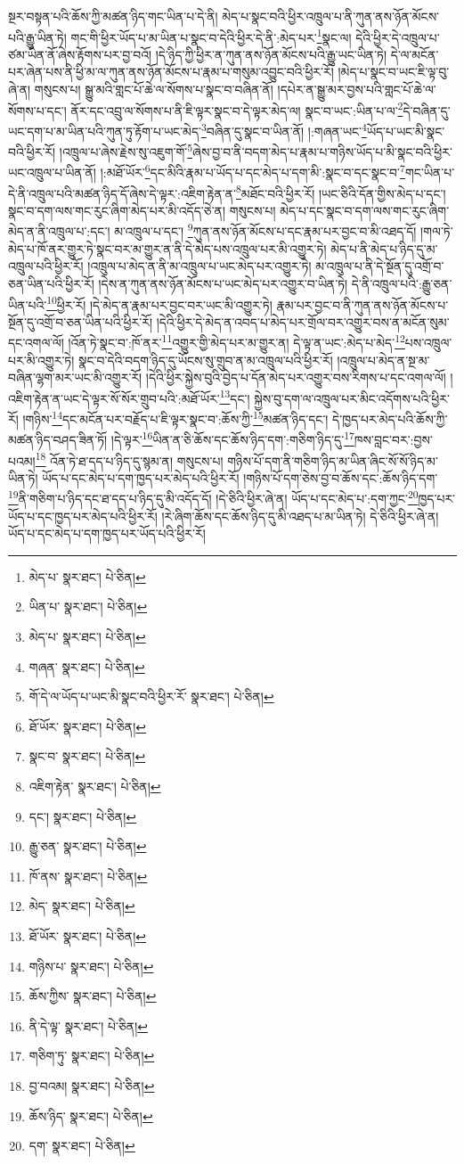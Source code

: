 སྔར་བསྟན་པའི་ཆོས་ཀྱི་མཚན་ཉིད་གང་ཡིན་པ་དེ་ནི། མེད་པ་སྣང་བའི་ཕྱིར་འཁྲུལ་པ་ནི་ཀུན་ནས་ཉོན་མོངས་པའི་རྒྱུ་ཡིན་ཏེ། གང་གི་ཕྱིར་ཡོད་པ་མ་ཡིན་པ་སྣང་བ་དེའི་ཕྱིར་དེ་ནི་:མེད་པར་\footnote{མེད་པ་  སྣར་ཐང་།  པེ་ཅིན། }སྣང་ལ། དེའི་ཕྱིར་དེ་འཁྲུལ་པ་ཙམ་ཡིན་ནོ་ཞེས་རྟོགས་པར་བྱ་བའོ། །དེ་ཉིད་ཀྱི་ཕྱིར་ན་ཀུན་ནས་ཉོན་མོངས་པའི་རྒྱུ་ཡང་ཡིན་ཏེ། དེ་ལ་མངོན་པར་ཞེན་པས་ནི་ཕྱི་མ་ལ་ཀུན་ནས་ཉོན་མོངས་པ་རྣམ་པ་གསུམ་འབྱུང་བའི་ཕྱིར་རོ། །མེད་པ་སྣང་བ་ཡང་ཇི་ལྟ་བུ་ཞེ་ན། གསུངས་པ། སྒྱུ་མའི་གླང་པོ་ཆེ་ལ་སོགས་པ་སྣང་བ་བཞིན་ནོ། །དཔེར་ན་སྒྱུ་མར་བྱས་པའི་གླང་པོ་ཆེ་ལ་སོགས་པ་དང་། ནོར་དང་འབྲུ་ལ་སོགས་པ་ནི་ཇི་ལྟར་སྣང་བ་དེ་ལྟར་མེད་ལ། སྣང་བ་ཡང་:ཡིན་པ་ལ་\footnote{ཡིན་པ་  སྣར་ཐང་།  པེ་ཅིན། }དེ་བཞིན་དུ་ཡང་དག་པ་མ་ཡིན་པའི་ཀུན་ཏུ་རྟོག་པ་ཡང་མེད་\footnote{མེད་པ་  སྣར་ཐང་།  པེ་ཅིན། }བཞིན་དུ་སྣང་བ་ཡིན་ནོ། །:གཞན་ཡང་\footnote{གཞན་  སྣར་ཐང་།  པེ་ཅིན། }ཡོད་པ་ཡང་མི་སྣང་བའི་ཕྱིར་རོ། །འཁྲུལ་པ་ཞེས་རྗེས་སུ་འཇུག་གོ་\footnote{གོ་དེ་ལ་ཡོད་པ་ཡང་མི་སྣང་བའི་ཕྱིར་རོ་  སྣར་ཐང་།  པེ་ཅིན། }ཞེས་བྱ་བ་ནི་བདག་མེད་པ་རྣམ་པ་གཉིས་ཡོད་པ་མི་སྣང་བའི་ཕྱིར་ཡང་འཁྲུལ་པ་ཡིན་ནོ། །:མཐོ་ཡོར་\footnote{ཐོ་ཡོར་  སྣར་ཐང་།  པེ་ཅིན། }དང་མིའི་རྣམ་པ་ཡོད་པ་དང་མེད་པ་དག་མི་:སྣང་བ་དང་སྣང་བ་\footnote{སྣང་བ་  སྣར་ཐང་།  པེ་ཅིན། }གང་ཡིན་པ་དེ་ནི་འཁྲུལ་པའི་མཚན་ཉིད་དོ་ཞེས་དེ་ལྟར་:འཇིག་རྟེན་ན་\footnote{འཇིག་རྟེན་  སྣར་ཐང་།  པེ་ཅིན། }མཐོང་བའི་ཕྱིར་རོ། །ཡང་ཅིའི་དོན་གྱིས་མེད་པ་དང་། སྣང་བ་དག་ལས་གང་རུང་ཞིག་མེད་པར་མི་འདོད་ཅེ་ན། གསུངས་པ། མེད་པ་དང་སྣང་བ་དག་ལས་གང་རུང་ཞིག་མེད་ན་ནི་འཁྲུལ་པ་:དང་། མ་འཁྲུལ་པ་དང་། \footnote{དང་།    སྣར་ཐང་།  པེ་ཅིན། }ཀུན་ནས་ཉོན་མོངས་པ་དང་རྣམ་པར་བྱང་བ་མི་འཐད་དོ། །གལ་ཏེ་མེད་པ་ཁོ་ནར་གྱུར་ཏེ་སྣང་བར་མ་གྱུར་ན་ནི་དེ་མེད་པས་འཁྲུལ་པར་མི་འགྱུར་ཏེ། མེད་པ་ནི་མེད་པ་ཉིད་དུ་མ་འཁྲུལ་པའི་ཕྱིར་རོ། །འཁྲུལ་པ་མེད་ན་ནི་མ་འཁྲུལ་པ་ཡང་མེད་པར་འགྱུར་ཏེ། མ་འཁྲུལ་པ་ནི་དེ་སྔོན་དུ་འགྲོ་བ་ཅན་ཡིན་པའི་ཕྱིར་རོ། །དེས་ན་ཀུན་ནས་ཉོན་མོངས་པ་ཡང་མེད་པར་འགྱུར་བ་ཡིན་ཏེ། དེ་ནི་འཁྲུལ་པའི་:རྒྱུ་ཅན་ཡིན་པའི་\footnote{རྒྱུ་ཅན་  སྣར་ཐང་།  པེ་ཅིན། }ཕྱིར་རོ། །དེ་མེད་ན་རྣམ་པར་བྱང་བར་ཡང་མི་འགྱུར་ཏེ། རྣམ་པར་བྱང་བ་ནི་ཀུན་ནས་ཉོན་མོངས་པ་སྔོན་དུ་འགྲོ་བ་ཅན་ཡིན་པའི་ཕྱིར་རོ། །དེའི་ཕྱིར་དེ་མེད་ན་འབད་པ་མེད་པར་གྲོལ་བར་འགྱུར་བས་ན་མངོན་སུམ་དང་འགལ་ལོ། །འོན་ཏེ་སྣང་བ་:ཁོ་ནར་\footnote{ཁོ་ནས་  སྣར་ཐང་།  པེ་ཅིན། }འགྱུར་གྱི་མེད་པར་མ་གྱུར་ན། དེ་ལྟ་ན་ཡང་:མེད་པ་མེད་\footnote{མེད་  སྣར་ཐང་།  པེ་ཅིན། }པས་འཁྲུལ་པར་མི་འགྱུར་ཏེ། སྣང་བ་དེའི་བདག་ཉིད་དུ་ཡོངས་སུ་གྲུབ་ན་མ་འཁྲུལ་པའི་ཕྱིར་རོ། །འཁྲུལ་པ་མེད་ན་སྔ་མ་བཞིན་ལྷག་མར་ཡང་མི་འགྱུར་རོ། །དེའི་ཕྱིར་སྐྱེས་བུའི་བྱེད་པ་དོན་མེད་པར་འགྱུར་བས་རིགས་པ་དང་འགལ་ལོ། །འཇིག་རྟེན་ན་ཡང་དེ་ལྟར་སོ་སོར་གྲུབ་པའི་:མཐོ་ཡོར་\footnote{ཐོ་ཡོར་  སྣར་ཐང་།  པེ་ཅིན། }དང་། སྐྱེས་བུ་དག་ལ་འཁྲུལ་པར་མིང་འདོགས་པའི་ཕྱིར་རོ། །གཉིས་\footnote{གཉིས་པ་  སྣར་ཐང་།  པེ་ཅིན། }དང་མངོན་པར་བརྗོད་པ་ཇི་ལྟར་སྣང་བ་:ཆོས་ཀྱི་\footnote{ཆོས་ཀྱིས་  སྣར་ཐང་།  པེ་ཅིན། }མཚན་ཉིད་དང་། དེ་ཁྱད་པར་མེད་པའི་ཆོས་ཀྱི་མཚན་ཉིད་བཤད་ཟིན་ཏོ། །དེ་ལྟར་\footnote{ནི་དེ་ལྟ་  སྣར་ཐང་།  པེ་ཅིན། }ཡིན་ན་ཅི་ཆོས་དང་ཆོས་ཉིད་དག་:གཅིག་ཉིད་དུ་\footnote{གཅིག་ཏུ་  སྣར་ཐང་།  པེ་ཅིན། }ཁས་བླང་བར་:བྱས་པའམ།\footnote{བྱ་བའམ།  སྣར་ཐང་།  པེ་ཅིན། } འོན་ཏེ་ཐ་དད་པ་ཉིད་དུ་སྙམ་ན། གསུངས་པ། གཉིས་པོ་དག་ནི་གཅིག་ཉིད་མ་ཡིན་ཞིང་སོ་སོ་ཉིད་མ་ཡིན་ཏེ། ཡོད་པ་དང་མེད་པ་དག་ཁྱད་པར་མེད་པའི་ཕྱིར་རོ། །གཉིས་པོ་དག་ཅེས་བྱ་བ་ཆོས་དང་:ཆོས་ཉིད་དག་\footnote{ཆོས་ཉིད་  སྣར་ཐང་།  པེ་ཅིན། }ནི་གཅིག་པ་ཉིད་དང་ཐ་དད་པ་ཉིད་དུ་མི་འདོད་དོ། །དེ་ཅིའི་ཕྱིར་ཞེ་ན། ཡོད་པ་དང་མེད་པ་:དག་ཀྱང་\footnote{དག་  སྣར་ཐང་།  པེ་ཅིན། }ཁྱད་པར་ཡོད་པ་དང་ཁྱད་པར་མེད་པའི་ཕྱིར་རོ། །རེ་ཞིག་ཆོས་དང་ཆོས་ཉིད་དུ་མི་འཐད་པ་མ་ཡིན་ཏེ། དེ་ཅིའི་ཕྱིར་ཞེ་ན། ཡོད་པ་དང་མེད་པ་དག་ཁྱད་པར་ཡོད་པའི་ཕྱིར་རོ། 